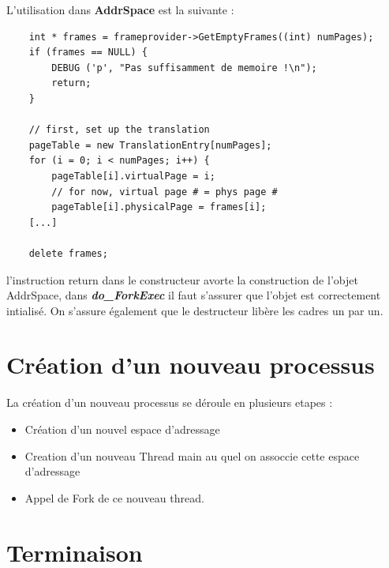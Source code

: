 \documentclass[a4paper,10pt]{article}
\begin{document}
L'utilisation dans \textbf{AddrSpace} est la suivante :

\begin{lstlisting}
    int * frames = frameprovider->GetEmptyFrames((int) numPages);
    if (frames == NULL) {
        DEBUG ('p', "Pas suffisamment de memoire !\n");
        return;
    }

    // first, set up the translation
    pageTable = new TranslationEntry[numPages];
    for (i = 0; i < numPages; i++) {
        pageTable[i].virtualPage = i;
        // for now, virtual page # = phys page #
        pageTable[i].physicalPage = frames[i];
    [...]

    delete frames;
\end{lstlisting}

l'instruction return dans le constructeur avorte la construction de l'objet
AddrSpace, dans \textbf{\textit{do\_ForkExec}} il faut s'assurer que l'objet est
correctement intialisé.
On s'assure également que le destructeur libère les cadres un par un.


\section{Création d'un nouveau processus}

La création d'un nouveau processus se déroule en plusieurs etapes :
\begin{itemize}
\item Création d'un nouvel espace d'adressage
\item Creation d'un nouveau Thread main au quel on assoccie cette espace
d'adressage
\item Appel de Fork de ce nouveau thread.
\end{itemize}



\section{Terminaison}
\end{document}
